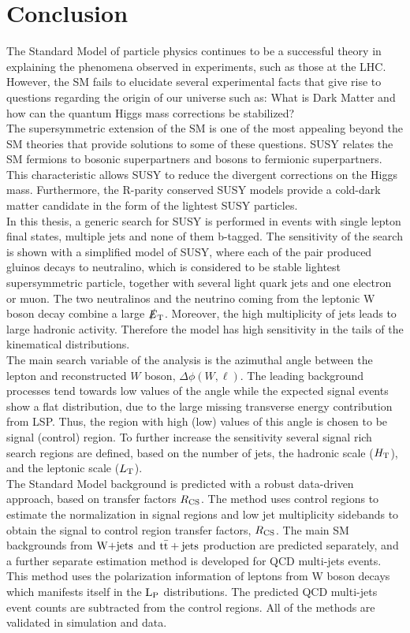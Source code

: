\chapter*{Conclusion}
The Standard Model of particle physics continues to be a successful theory in explaining the phenomena observed in experiments, such as those at the LHC. However, the SM fails to elucidate several experimental facts that give rise to questions regarding the origin of our universe such as: What is Dark Matter and how can the quantum Higgs mass corrections be stabilized?\\
The supersymmetric extension of the SM is one of the most appealing beyond the SM theories that provide solutions to some of these questions. SUSY relates the SM fermions to bosonic superpartners and bosons to fermionic superpartners. This characteristic allows SUSY to reduce the divergent corrections on the Higgs mass.  Furthermore, the R-parity conserved SUSY models provide a cold-dark matter candidate in the form of the lightest SUSY particles. \\
In this thesis, a generic search for SUSY is performed in events with single lepton final states, multiple jets and none of them b-tagged. The sensitivity of the search is shown with a simplified model of SUSY, where each of the pair produced gluinos decays to neutralino, which is considered to be stable lightest supersymmetric particle, together with several light quark jets and one electron or muon. The two neutralinos and the neutrino coming from the leptonic W boson decay combine a large $\slashed{E}_{\rm T}$. Moreover, the high multiplicity of jets leads to large hadronic activity. Therefore the model has high sensitivity in the tails of the kinematical distributions.  \\
The main search variable of the analysis is the azimuthal angle between the lepton and reconstructed $W$ boson, $\Delta\phi(W,\ell)$. The leading background processes tend towards low values of the angle while the expected signal events show a flat distribution, due to the large missing transverse energy contribution from LSP. Thus, the region with high (low) values of this angle is chosen to be signal (control) region. To further increase the sensitivity several signal rich search regions are defined, based on the number of jets, the hadronic scale ($H_{\rm T}$), and the leptonic scale ($L_{\rm T}$).\\
The Standard Model background is predicted with a robust data-driven approach, based on transfer factors $R_{\rm CS}$. The method uses control regions to estimate the normalization in signal regions and low jet multiplicity sidebands to obtain the signal to control region transfer factors, $R_{\rm CS}$. The main SM backgrounds from $\textrm{W+jets}$ and ${\rm t\bar{t}+jets}$ production are predicted separately, and a further separate estimation method is developed for QCD multi-jets events.  This method uses the polarization information of leptons from W boson decays which manifests itself in the $\rm L_P$ distributions. The predicted QCD multi-jets event counts are subtracted from the control regions. All of the methods are validated in simulation and data. \\

